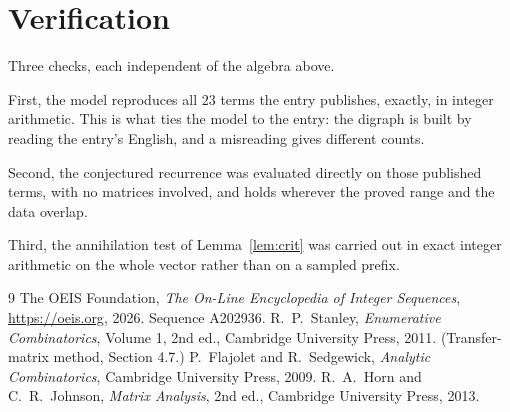 \documentclass[11pt,a4paper]{article}
\theoremstyle{plain}
\theoremstyle{definition}
\begin{document}
\section{Verification}

Three checks, each independent of the algebra above.

First, the model reproduces all $23$ terms the entry publishes, exactly, in integer
arithmetic. This is what ties the model to the entry: the digraph is built by reading the
entry's English, and a misreading gives different counts.

Second, the conjectured recurrence was evaluated directly on those published terms, with no
matrices involved, and holds wherever the proved range and the data overlap.

Third, the annihilation test of Lemma~\ref{lem:crit} was carried out in exact integer
arithmetic on the whole vector rather than on a sampled prefix.

\begin{thebibliography}{9}
 The OEIS Foundation, \emph{The On-Line Encyclopedia of Integer
Sequences}, \url{https://oeis.org}, 2026. Sequence A202936.
 R.~P.~Stanley, \emph{Enumerative Combinatorics}, Volume 1, 2nd ed.,
Cambridge University Press, 2011. (Transfer-matrix method, Section 4.7.)
 P.~Flajolet and R.~Sedgewick, \emph{Analytic Combinatorics}, Cambridge
University Press, 2009.
 R.~A.~Horn and C.~R.~Johnson, \emph{Matrix Analysis}, 2nd ed., Cambridge
University Press, 2013.
\end{thebibliography}
\end{document}

